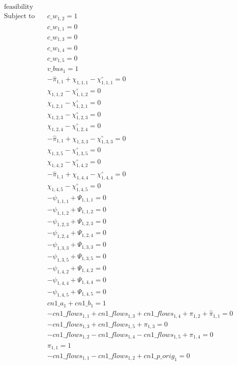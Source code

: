 \documentclass[]{article}
\begin{document}
\begin{align*}
\text{feasibility}\\
\text{Subject to} \quad & c\_w_{1,2} = 1\\
 & c\_w_{1,1} = 0\\
 & c\_w_{1,3} = 0\\
 & c\_w_{1,4} = 0\\
 & c\_w_{1,5} = 0\\
 & v\_bus_{1} = 1\\
 & -\hat{\pi} _{1,1} + \chi_{1,1,1} - \chi^\circ_{1,1,1} = 0\\
 & \chi_{1,1,2} - \chi^\circ_{1,1,2} = 0\\
 & \chi_{1,2,1} - \chi^\circ_{1,2,1} = 0\\
 & \chi_{1,2,3} - \chi^\circ_{1,2,3} = 0\\
 & \chi_{1,2,4} - \chi^\circ_{1,2,4} = 0\\
 & -\hat{\pi} _{1,1} + \chi_{1,3,3} - \chi^\circ_{1,3,3} = 0\\
 & \chi_{1,3,5} - \chi^\circ_{1,3,5} = 0\\
 & \chi_{1,4,2} - \chi^\circ_{1,4,2} = 0\\
 & -\hat{\pi} _{1,1} + \chi_{1,4,4} - \chi^\circ_{1,4,4} = 0\\
 & \chi_{1,4,5} - \chi^\circ_{1,4,5} = 0\\
 & -\psi_{1,1,1} + \Psi_{1,1,1} = 0\\
 & -\psi_{1,1,2} + \Psi_{1,1,2} = 0\\
 & -\psi_{1,2,3} + \Psi_{1,2,3} = 0\\
 & -\psi_{1,2,4} + \Psi_{1,2,4} = 0\\
 & -\psi_{1,3,3} + \Psi_{1,3,3} = 0\\
 & -\psi_{1,3,5} + \Psi_{1,3,5} = 0\\
 & -\psi_{1,4,2} + \Psi_{1,4,2} = 0\\
 & -\psi_{1,4,4} + \Psi_{1,4,4} = 0\\
 & -\psi_{1,4,5} + \Psi_{1,4,5} = 0\\
 & cn1\_a_{1} + cn1\_b_{1} = 1\\
 & -cn1\_flows_{1,1} + cn1\_flows_{1,3} + cn1\_flows_{1,4} + \pi_{1,2} + \hat{\pi} _{1,1} = 0\\
 & -cn1\_flows_{1,3} + cn1\_flows_{1,5} + \pi_{1,3} = 0\\
 & -cn1\_flows_{1,2} - cn1\_flows_{1,4} - cn1\_flows_{1,5} + \pi_{1,4} = 0\\
 & \pi_{1,1} = 1\\
 & -cn1\_flows_{1,1} - cn1\_flows_{1,2} + cn1\_p\_orig_{1} = 0\\

\end{align*}
\end{document}
